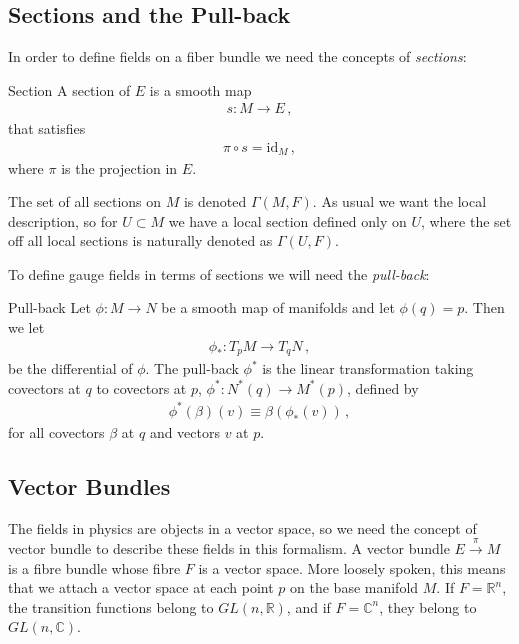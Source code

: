 \subsection*{Sections and the Pull-back}
In order to define fields on a fiber bundle we need the concepts of \emph{sections}:

\begin{mydef}{Section}{}
A section of $E$ is a smooth map
\begin{align*}
    s:M\rightarrow E\,,
\end{align*}
that satisfies
\begin{align*}
    \pi\circ s=\text{id}_{M}\,,
\end{align*}
where $\pi$ is the projection in $E$.
\end{mydef}\noindent
The set of all sections on $M$ is denoted $\Gamma(M,F)$. As usual we want the local description, so for $U\subset M$ we have a local section defined only on $U$, where the set off all local sections is naturally denoted as $\Gamma(U,F)$. 

To define gauge fields in terms of sections we will need the \emph{pull-back}:
\begin{mydef}{Pull-back}{}
Let $\phi:M\rightarrow N$ be a smooth map of manifolds and let $\phi(q)=p$. Then we let
\begin{align}
    \phi_{*}:T_{p}M\rightarrow T_{q}N\,,
\end{align}
be the differential of $\phi$. The pull-back $\phi^{*}$ is the linear transformation taking covectors at $q$ to covectors at $p$, $\phi^{*}:N^{*}(q)\rightarrow M^{*}(p)$, defined by 
\begin{align}
    \phi^{*}(\beta)(v)\equiv\beta(\phi_{*}(v))\,,\label{eq:pullback}
\end{align}
for all covectors $\beta$ at $q$ and vectors $v$ at $p$.
\end{mydef}


\subsection*{Vector Bundles}
The fields in physics are objects in a vector space, so we need the concept of vector bundle to describe these fields in this formalism. A vector bundle $E\overset{\pi}{\longrightarrow} M$ is a fibre bundle whose fibre $F$ is a vector space. More loosely spoken, this means that we attach a vector space at each point $p$ on the base manifold $M$. If $F=\mathbb{R}^{n}$, the transition functions belong to $GL(n,\mathbb{R})$, and if $F=\mathbb{C}^{n}$, they belong to $GL(n,\mathbb{C})$.


